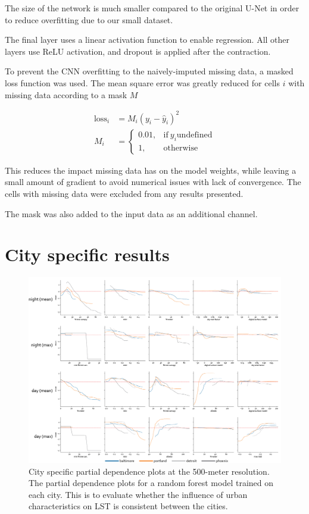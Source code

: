 \documentclass[review]{elsarticle}
\begin{document}
The size of the network is much smaller compared to the original U-Net in order to reduce overfitting due to our small dataset.

The final layer uses a linear activation function to enable regression. All other layers use ReLU activation, and dropout is applied after the contraction.

To prevent the CNN overfitting to the naively-imputed missing data, a masked loss function was used. The mean square error was greatly reduced for cells $i$ with missing data according to a mask $M$

\begin{align*}
    \mathrm{loss}_i &= M_i(y_i - \hat y _i) ^ 2\\
    M_i &= \begin{cases}
      0.01, & \text{if}\ y_i \mathrm{undefined} \\
      1, & \text{otherwise}
    \end{cases}
\end{align*}

This reduces the impact missing data has on the model weights, while leaving a small amount of gradient to avoid numerical issues with lack of convergence. The cells with missing data were excluded from any results presented.

The mask was also added to the input data as an additional channel.





\newpage
\section{City specific results}
\label{ss:city}
\begin{figure}[h]
    \centering
    \includegraphics[width=\linewidth]{fig/report/pdp_cities_500.png}
    \caption[City specific partial dependence plots at the 500-meter resolution]{
    City specific partial dependence plots at the 500-meter resolution.
    The partial dependence plots for a random forest model trained on each city.
    This is to evaluate whether the influence of urban characteristics on LST is consistent between the cities.
    }
    \label{fig:cities_500}
\end{figure}
\end{document}
